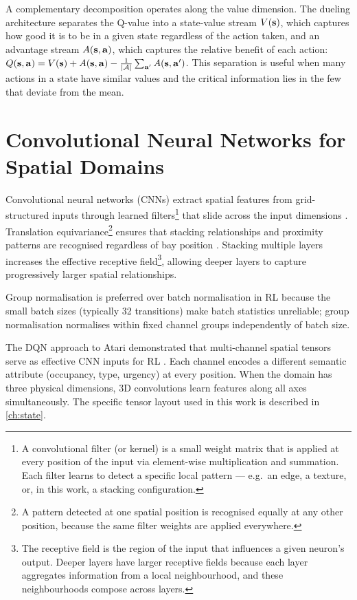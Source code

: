 A complementary decomposition operates along the value dimension. The dueling architecture \cite{wang2016dueling} separates the Q-value into a state-value stream $V(\mathbf{s})$, which captures how good it is to be in a given state regardless of the action taken, and an advantage stream $A(\mathbf{s}, \mathbf{a})$, which captures the relative benefit of each action: $Q(\mathbf{s}, \mathbf{a}) = V(\mathbf{s}) + A(\mathbf{s}, \mathbf{a}) - \frac{1}{|\mathcal{A}|}\sum_{\mathbf{a}'} A(\mathbf{s}, \mathbf{a}')$. This separation is useful when many actions in a state have similar values and the critical information lies in the few that deviate from the mean.

\section{Convolutional Neural Networks for Spatial Domains}
\label{sec:bg:cnn}

Convolutional neural networks (CNNs) extract spatial features from grid-structured inputs through learned filters\footnote{A convolutional filter (or kernel) is a small weight matrix that is applied at every position of the input via element-wise multiplication and summation. Each filter learns to detect a specific local pattern --- e.g.\ an edge, a texture, or, in this work, a stacking configuration.} that slide across the input dimensions \cite{lecun1998}. Translation equivariance\footnote{A pattern detected at one spatial position is recognised equally at any other position, because the same filter weights are applied everywhere.} ensures that stacking relationships and proximity patterns are recognised regardless of bay position \cite{goodfellow2016}. Stacking multiple layers increases the effective receptive field\footnote{The receptive field is the region of the input that influences a given neuron's output. Deeper layers have larger receptive fields because each layer aggregates information from a local neighbourhood, and these neighbourhoods compose across layers.}, allowing deeper layers to capture progressively larger spatial relationships.

Group normalisation \cite{wu2020groupnorm} is preferred over batch normalisation in RL because the small batch sizes (typically 32 transitions) make batch statistics unreliable; group normalisation normalises within fixed channel groups independently of batch size.

The DQN approach to Atari demonstrated that multi-channel spatial tensors serve as effective CNN inputs for RL \cite{mnih2015dqn}. Each channel encodes a different semantic attribute (occupancy, type, urgency) at every position. When the domain has three physical dimensions, 3D convolutions \cite{ji20133dcnn} learn features along all axes simultaneously. The specific tensor layout used in this work is described in \cref{ch:state}.

